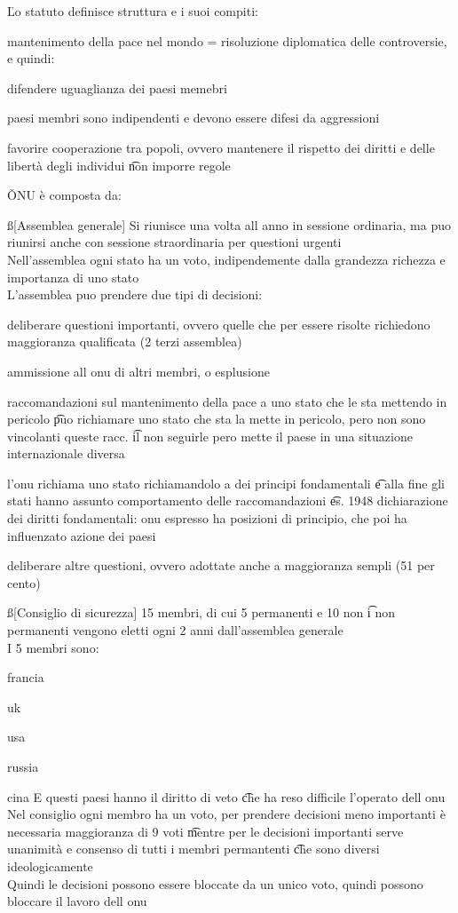 \documentclass[12pt]{article}
\begin{document}
\v

Lo statuto definisce struttura e i suoi compiti:
\bi
\item mantenimento della pace nel mondo = risoluzione diplomatica delle controversie, e quindi:
  \bi
    \item difendere uguaglianza dei paesi memebri
    \item paesi membri sono indipendenti e devono essere difesi da aggressioni
    \item 
  \ei
\item favorire cooperazione tra popoli, ovvero mantenere il rispetto dei diritti e delle libertà degli individui \t non imporre regole 
\ei

\v

ONU è composta da:

\ss[Assemblea generale]
Si riunisce una volta all anno in sessione ordinaria, ma puo riunirsi anche con sessione straordinaria per questioni urgenti \\
Nell'assemblea ogni stato ha un voto, indipendemente dalla grandezza richezza e importanza di uno stato \\
L'assemblea puo prendere due tipi di decisioni:
\bi
  \item deliberare questioni importanti, ovvero quelle che per essere risolte richiedono maggioranza qualificata (2 terzi assemblea)
    \bi
      \item ammissione all onu di altri membri, o esplusione
      \item raccomandazioni sul mantenimento della pace a uno stato che le sta mettendo in pericolo \t puo richiamare uno stato che sta la mette in pericolo, pero non sono vincolanti queste racc. \t il non seguirle pero mette il paese in una situazione internazionale diversa
      \item l'onu richiama uno stato richiamandolo a dei principi fondamentali \t e alla fine gli stati hanno assunto comportamento delle raccomandazioni \t es. 1948 dichiarazione dei diritti fondamentali: onu espresso ha posizioni di principio, che poi ha influenzato azione dei paesi
    \ei
  \item deliberare altre questioni, ovvero adottate anche a maggioranza sempli (51 per cento)
\ei

\ss[Consiglio di sicurezza]
15 membri, di cui 5 permanenti e 10 non \t i non permanenti vengono eletti ogni 2 anni dall'assemblea generale \\
I 5 membri sono:
\bi
  \item francia
  \item uk
  \item usa
  \item russia
  \item cina
\ei
E questi paesi hanno il diritto di veto \t che ha reso difficile l'operato dell onu \\
Nel consiglio ogni membro ha un voto, per prendere decisioni meno importanti è necessaria maggioranza di 9 voti \t mentre per le decisioni importanti serve unanimità e consenso di tutti i membri permantenti \t che sono diversi ideologicamente \\
Quindi le decisioni possono essere bloccate da un unico voto, quindi possono bloccare il lavoro dell onu
\end{document}
